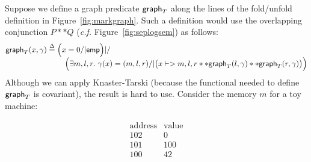 Suppose we define a graph predicate $\mathsf{graph}_T$ along the lines of the fold/unfold definition in Figure~\ref{fig:markgraph}.  Such a definition would use the overlapping conjunction $P ** Q$ (\emph{c.f.} Figure~\ref{fig:seplogsem}) as follows: %
\vspace{-1ex}
\[
\begin{array}{@{}l@{}l@{}}
\graphkt(x, \gamma) \stackrel{\Delta}{=} \; &\Big(x = 0 /| \p{emp}\Big) |/ \\
&\quad \Big(\exists m,l,r.~ \gamma(x)=(m,l,r) /|
\big(x |-> m,l,r ** \graphkt(l, \gamma) ** \graphkt(r, \gamma)\big)\Big)
\end{array}
\vspace{-1ex}
\]
Although we can apply Knaster-Tarski (because the functional needed to
define $\mathsf{graph}_T$ is covariant), the result is hard to use.
Consider the memory $m$ for a toy machine:


\begin{wrapfigure}{r}{.39\textwidth}
\vspace{-1em} %
\begin{minipage}{.20\textwidth}
\qquad \[
\begin{array}{c|c}
\textrm{address} & \textrm{value} \\
\hline
102 & 0 \\
101 & 100 \\
100 & 42 \\
\end{array}
\]
\end{minipage}%
\begin{minipage}{.19\textwidth}
\centering
\end{minipage}
\vspace{-0.5em} %
\end{wrapfigure}

